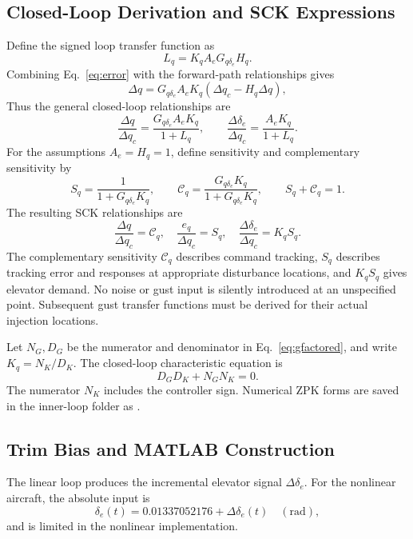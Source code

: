 \documentclass[a4paper,11pt]{article}
\newcommand{\de}{\delta_e}
\newcommand{\Gq}{G_{q\delta_e}}
\newcommand{\file}[1]{\mbox{\texttt{\small\detokenize{#1}}}}
\begin{document}
\subsection{Closed-Loop Derivation and SCK Expressions}
Define the signed loop transfer function as
\begin{equation}
L_q=K_q A_e\Gq H_q.
\end{equation}
Combining Eq.~\eqref{eq:error} with the forward-path relationships gives
\begin{equation}
\Delta q=\Gq A_eK_q(\Delta q_c-H_q\Delta q),
\end{equation}
Thus the general closed-loop relationships are
\begin{equation}
\frac{\Delta q}{\Delta q_c}=\frac{\Gq A_eK_q}{1+L_q},\qquad
\frac{\Delta\de}{\Delta q_c}=\frac{A_eK_q}{1+L_q}.
\end{equation}
For the assumptions $A_e=H_q=1$, define sensitivity and complementary sensitivity by
\begin{equation}\label{eq:sck}
S_q=\frac{1}{1+\Gq K_q},\qquad
\mathcal C_q=\frac{\Gq K_q}{1+\Gq K_q},\qquad S_q+\mathcal C_q=1.
\end{equation}
The resulting SCK relationships are
\begin{equation}\label{eq:cl}
\boxed{\frac{\Delta q}{\Delta q_c}=\mathcal C_q,\quad
\frac{e_q}{\Delta q_c}=S_q,\quad
\frac{\Delta\de}{\Delta q_c}=K_qS_q.}
\end{equation}
The complementary sensitivity $\mathcal C_q$ describes command tracking, $S_q$ describes tracking error and responses at appropriate disturbance locations, and $K_qS_q$ gives elevator demand. No noise or gust input is silently introduced at an unspecified point. Subsequent gust transfer functions must be derived for their actual injection locations.

Let $N_G,D_G$ be the numerator and denominator in Eq.~\eqref{eq:gfactored}, and write $K_q=N_K/D_K$. The closed-loop characteristic equation is
\begin{equation}
D_GD_K+N_GN_K=0.
\end{equation}
The numerator $N_K$ includes the controller sign. Numerical ZPK forms are saved in the inner-loop folder as \file{zpk.txt}.

\subsection{Trim Bias and MATLAB Construction}
The linear loop produces the incremental elevator signal $\Delta\de$. For the nonlinear aircraft, the absolute input is
\begin{equation}
\de(t)=0.01337052176+\Delta\de(t)\quad(\mathrm{rad}),
\end{equation}
and is limited in the nonlinear implementation.
\end{document}
